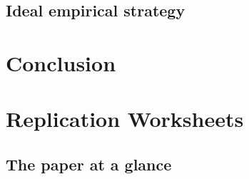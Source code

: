 \documentclass[12pt,a4paper]{article}
\newcommand{\tablenotes}[1]{\par\vspace{4pt}{\footnotesize\textit{Notes:} #1\par}}
\begin{document}


\subsection{Ideal empirical strategy}



\section{Conclusion}






\clearpage
\appendix
\section{Replication Worksheets}

\subsection{The paper at a glance}
\end{document}
